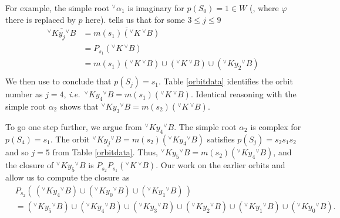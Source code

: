 \documentclass[a4paper, 11pt]{article}
\begin{document}

For example, the simple root ${^\vee}\alpha_{1}$ is  imaginary  for $p(S_{0})
= 1 \in W$ (\cite[1.6]{RS90}, where $\varphi$ there is replaced by $p$
here). 
\cite[4.3.4]{RS90} tells us that for some $3\leq j \leq 9$
\begin{align*}
\overline{{^\vee}Ky_{j} {^\vee}B} &= \overline{m(s_{1})({^\vee}K \,
     {^\vee}B)} \\
&= P_{s_{1}}({^\vee}K\, {^\vee}B)\\
& = m(s_{1})({^\vee}K \,
     {^\vee}B) \cup ({^\vee}K\, {^\vee}B) \cup ({^\vee}K y_{2} {^\vee}B)\\
\end{align*}
We then use  \cite[Lemma 7.4 (i)]{RS90}
 to conclude that
$p(S_{j}) = s_{1}$.  Table \ref{orbitdata} identifies the orbit number
as $j=4$, \emph{i.e.}~${^\vee}Ky_{4} {^\vee}B = m(s_{1})({^\vee}K \,
     {^\vee}B)$.  
Identical reasoning with the simple root $\alpha_{2}$ shows that
${^\vee}Ky_{3} {^\vee}B = m(s_{2})({^\vee}K \, {^\vee}B)$.

To go one step further, we argue from ${^\vee}K y_{4}
{^\vee}B$. The simple root 
$\alpha_{2}$ is complex for $p(S_{4}) = s_{1}$.  The orbit ${^\vee}K
y_{j} {^\vee}B = m(s_{2})({^\vee}K y_{4} {^\vee}B )$
satisfies $p(S_{j}) = s_{2}s_{1}s_{2}$ and so $j=5$ from Table
\ref{orbitdata}.  Thus, ${^\vee}K
y_{5} {^\vee}B = m(s_{2})({^\vee}K y_{4} {^\vee}B )$, and
the closure of ${^\vee}K y_{5} {^\vee}B$ is  
$P_{s_{2}}P_{s_{1}}({^\vee}K\, {^\vee}B)$. 
Our work on the earlier orbits and
\cite[4.3.1]{RS90} allow us to compute the closure as 
\begin{align*}
&P_{s_{2}} \left( \, ({^\vee}Ky_{4} {^\vee}B )\cup ({^\vee}Ky_{0}
{^\vee}B) \cup ({^\vee}Ky_{1} {^\vee}B) \, \right)\\
&  =  ({^\vee}Ky_{5}
{^\vee}B) \cup ({^\vee}Ky_{4} {^\vee}B) \cup  ({^\vee}Ky_{3}
{^\vee}B) \cup  ({^\vee}Ky_{2} {^\vee}B) \cup ({^\vee}Ky_{1}
{^\vee}B) \cup ({^\vee}Ky_{0} {^\vee}B).
\end{align*}
\end{document}
